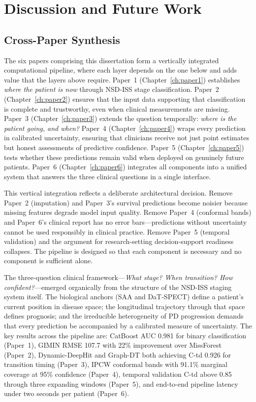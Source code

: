 
\chapter{Discussion and Future Work}
\label{ch:discussion}

\section{Cross-Paper Synthesis}
\label{sec:synthesis}

The six papers comprising this dissertation form a vertically integrated computational pipeline, where each layer depends on the one below and adds value that the layers above require. Paper~1 (Chapter~\ref{ch:paper1}) establishes \textit{where the patient is now} through NSD-ISS stage classification. Paper~2 (Chapter~\ref{ch:paper2}) ensures that the input data supporting that classification is complete and trustworthy, even when clinical measurements are missing. Paper~3 (Chapter~\ref{ch:paper3}) extends the question temporally: \textit{where is the patient going, and when?} Paper~4 (Chapter~\ref{ch:paper4}) wraps every prediction in calibrated uncertainty, ensuring that clinicians receive not just point estimates but honest assessments of predictive confidence. Paper~5 (Chapter~\ref{ch:paper5}) tests whether these predictions remain valid when deployed on genuinely future patients. Paper~6 (Chapter~\ref{ch:paper6}) integrates all components into a unified system that answers the three clinical questions in a single interface.

This vertical integration reflects a deliberate architectural decision. Remove Paper~2 (imputation) and Paper~3's survival predictions become noisier because missing features degrade model input quality. Remove Paper~4 (conformal bands) and Paper~6's clinical report has no error bars---predictions without uncertainty cannot be used responsibly in clinical practice. Remove Paper~5 (temporal validation) and the argument for research-setting decision-support readiness collapses. The pipeline is designed so that each component is necessary and no component is sufficient alone.

The three-question clinical framework---\textit{What stage? When transition? How confident?}---emerged organically from the structure of the NSD-ISS staging system itself. The biological anchors (SAA and DaT-SPECT) define a patient's current position in disease space; the longitudinal trajectory through that space defines prognosis; and the irreducible heterogeneity of PD progression demands that every prediction be accompanied by a calibrated measure of uncertainty. The key results across the pipeline are: CatBoost AUC 0.981 for binary classification (Paper~1), GIMIN RMSE 107.7 with 22\% improvement over MissForest (Paper~2), Dynamic-DeepHit and Graph-DT both achieving C-td 0.926 for transition timing (Paper~3), IPCW conformal bands with 91.1\% marginal coverage at 95\% confidence (Paper~4), temporal validation C-td above 0.85 through three expanding windows (Paper~5), and end-to-end pipeline latency under two seconds per patient (Paper~6).


